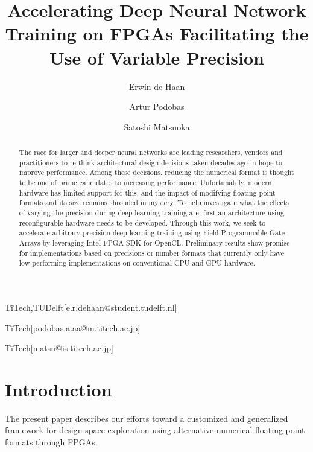 \documentclass[techrep,english]{ipsj}
\begin{document}
\title{Accelerating Deep Neural Network Training on FPGAs Facilitating the Use of Variable Precision}


\author{Erwin de Haan}{TiTech,TUDelft}[e.r.dehaan@student.tudelft.nl]
\author{Artur Podobas}{TiTech}[podobas.a.aa@m.titech.ac.jp]
\author{Satoshi Matsuoka}{TiTech}[matsu@is.titech.ac.jp]

\begin{abstract}
The race for larger and deeper neural networks are leading researchers, vendors and practitioners to re-think architectural design decisions taken decades ago in hope to improve performance.
Among these decisions, reducing the numerical format is thought to be one of prime candidates to increasing performance.
Unfortunately, modern hardware has limited support for this, and the impact of modifying floating-point formats and its size remains shrouded in mystery.
To help investigate what the effects of varying the precision during deep-learning training are, first an architecture using reconfigurable hardware needs to be developed.
Through this work, we seek to accelerate arbitrary precision deep-learning training using Field-Programmable Gate-Arrays by leveraging Intel FPGA SDK for OpenCL.
Preliminary results show promise for implementations based on precisions or number formats that currently only have low performing implementations on conventional CPU and GPU hardware.
\end{abstract}


\maketitle

\section{Introduction}
The present paper describes our efforts toward a customized and generalized framework for design-space exploration using alternative numerical floating-point formats through FPGAs.
\end{document}
